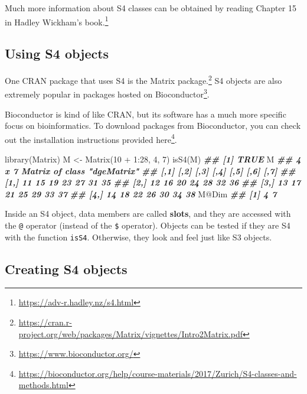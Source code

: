 \documentclass[
  12pt,
  krantz2]{krantz}
\makeatletter
\newenvironment{Shaded}{\begin{snugshade}}{\end{snugshade}}
\newcommand{\DecValTok}[1]{\textcolor[rgb]{0.06,0.06,0.06}{#1}}
\newcommand{\DocumentationTok}[1]{\textcolor[rgb]{0.37,0.37,0.37}{\textbf{\textit{#1}}}}
\newcommand{\FunctionTok}[1]{\textcolor[rgb]{0,0,0}{#1}}
\newcommand{\NormalTok}[1]{#1}
\newcommand{\OtherTok}[1]{\textcolor[rgb]{0.37,0.37,0.37}{#1}}
\newcommand{\SpecialCharTok}[1]{\textcolor[rgb]{0,0,0}{#1}}
\renewcommand{\href}[2]{#2\footnote{\url{#1}}}
\newenvironment{kframe}{%
\medskip{}
\setlength{\fboxsep}{.8em}
 \def\at@end@of@kframe{}%
 \ifinner\ifhmode%
  \def\at@end@of@kframe{\end{minipage}}%
  \begin{minipage}{\columnwidth}%
 \fi\fi%
 \def\FrameCommand##1{\hskip\@totalleftmargin \hskip-\fboxsep
 \colorbox{shadecolor}{##1}\hskip-\fboxsep
     \hskip-\linewidth \hskip-\@totalleftmargin \hskip\columnwidth}%
 \MakeFramed {\advance\hsize-\width
   \@totalleftmargin\z@ \linewidth\hsize
   \@setminipage}}%
 {\par\unskip\endMakeFramed%
 \at@end@of@kframe}
\renewenvironment{Shaded}{\begin{kframe}}{\end{kframe}}
\makeatother
\begin{document}
Much more information about S4 classes can be obtained by reading \href{https://adv-r.hadley.nz/s4.html}{Chapter 15 in Hadley Wickham's book.}

\hypertarget{using-s4-objects}{%
\subsection{Using S4 objects}\label{using-s4-objects}}

One CRAN package that uses S4 is the \href{https://cran.r-project.org/web/packages/Matrix/vignettes/Intro2Matrix.pdf}{Matrix package.} S4 objects are also extremely popular in packages hosted on \href{https://www.bioconductor.org/}{Bioconductor}.

Bioconductor is kind of like CRAN, but its software has a much more specific focus on bioinformatics. To download packages from Bioconductor, you can check out the installation instructions provided \href{https://bioconductor.org/help/course-materials/2017/Zurich/S4-classes-and-methods.html}{here}.

\begin{Shaded}
\begin{Highlighting}[]
\FunctionTok{library}\NormalTok{(Matrix)}
\NormalTok{M }\OtherTok{\textless{}{-}} \FunctionTok{Matrix}\NormalTok{(}\DecValTok{10} \SpecialCharTok{+} \DecValTok{1}\SpecialCharTok{:}\DecValTok{28}\NormalTok{, }\DecValTok{4}\NormalTok{, }\DecValTok{7}\NormalTok{)}
\FunctionTok{isS4}\NormalTok{(M)}
\DocumentationTok{\#\# [1] TRUE}
\NormalTok{M}
\DocumentationTok{\#\# 4 x 7 Matrix of class "dgeMatrix"}
\DocumentationTok{\#\#      [,1] [,2] [,3] [,4] [,5] [,6] [,7]}
\DocumentationTok{\#\# [1,]   11   15   19   23   27   31   35}
\DocumentationTok{\#\# [2,]   12   16   20   24   28   32   36}
\DocumentationTok{\#\# [3,]   13   17   21   25   29   33   37}
\DocumentationTok{\#\# [4,]   14   18   22   26   30   34   38}
\NormalTok{M}\SpecialCharTok{@}\NormalTok{Dim}
\DocumentationTok{\#\# [1] 4 7}
\end{Highlighting}
\end{Shaded}

Inside an S4 object, data members are called \textbf{slots}, and they are accessed with the \texttt{@} operator (instead of the \texttt{\$} operator). Objects can be tested if they are S4 with the function \texttt{isS4}. Otherwise, they look and feel just like S3 objects.

\hypertarget{creating-s4-objects}{%
\subsection{Creating S4 objects}\label{creating-s4-objects}}
\end{document}
